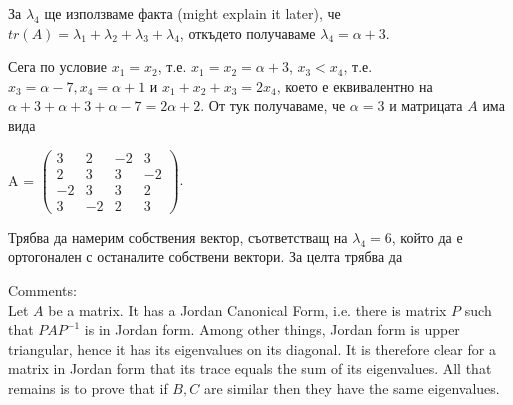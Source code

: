 \documentclass{article}
\begin{document}
\justify
За $\lambda_4$ ще използваме факта (might explain it later), че $tr(A) = \lambda_1 + \lambda_2 + \lambda_3 + \lambda_4$, откъдето получаваме $\lambda_4 = \alpha + 3$.

\justify
Сега по условие $x_1 = x_2$, т.е. $x_1 = x_ 2 = \alpha + 3$, $x_3 < x_4$, т.е. $x_3 = \alpha - 7, x_4 = \alpha + 1$ и $x_1 + x_2 + x_3 = 2x_4$, което е еквивалентно на $\alpha + 3 + \alpha + 3 + \alpha - 7 = 2\alpha + 2$. От тук получаваме, че $\alpha = 3$ и матрицата $A$ има вида

\begin{center}
    A = $\begin{pmatrix}
         3 & 2 & -2 & 3 \\
         2 & 3 & 3 & -2 \\
         -2 & 3 & 3 & 2 \\
         3 & -2 & 2 & 3
         \end{pmatrix}.$
\end{center}

\justify
Трябва да намерим собствения вектор, съответстващ на $\lambda_4 = 6$, който да е ортогонален с останалите собствени вектори. За целта трябва да 

\justify
Comments: \\
Let $A$ be a matrix.  It has a Jordan Canonical Form, i.e. there is matrix $P$ such that $PAP^{-1}$ is in Jordan form.  Among other things, Jordan form is upper triangular, hence it has its eigenvalues on its diagonal.  It is therefore clear for a matrix in Jordan form that its trace equals the sum of its eigenvalues.  All that remains is to prove that if $B,C$ are similar then they have the same eigenvalues.
\end{document}
